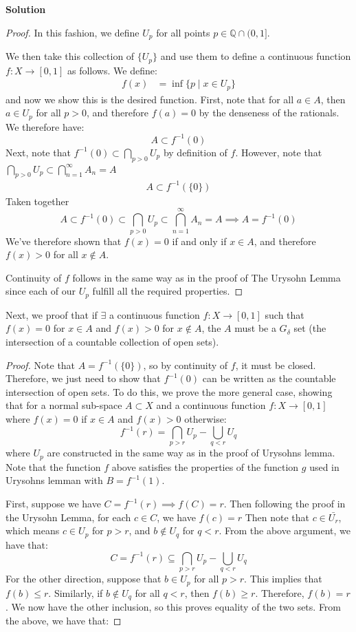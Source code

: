 \documentclass[12pt]{article}
\newcounter{AnswerCounter}
\newcounter{SubAnswerCounter}
\newenvironment{answer}[0]{
  \setcounter{SubAnswerCounter}{1}
  \bigskip
  \textbf{Solution \arabic{AnswerCounter}}
  \\
  \begin{small}
}{
  \end{small}
  \stepcounter{AnswerCounter}
}
\begin{document}
\begin{answer}[Page 213, \#4]
\begin{proof}
In this fashion, we define $U_p$ for all points $p \in \mathbb{Q} \cap (0,1]$.

We then take this collection of $\{ U_p\}$ and use them to define a continuous function $f : X \to [0,1]$ as follows. We define:
\begin{align*}
f(x) &= \inf \{ p \mid x \in U_p \}
\end{align*}
and now we show this is the desired function. First, note that for all $a \in A$, then $a \in U_p$ for all $p > 0$, and therefore $f(a) = 0$ by the denseness of the rationals. We therefore have:
$$
A \subset f^{-1}(0)
$$
Next, note that $f^{-1}(0) \subset \bigcap_{p > 0} U_p$ by definition of $f$. However, note that $\bigcap_{p > 0} U_p \subset \bigcap_{n=1}^{\infty} A_n = A$
\begin{align*}
A \subset f^{-1}(\{0\})
\end{align*}
Taken together
$$
A \subset f^{-1}(0) \subset \bigcap_{p > 0} U_p \subset \bigcap_{n=1}^{\infty} A_n = A \implies A = f^{-1}(0)
$$
We've therefore shown that $f(x) = 0$ if and only if $x \in A$, and therefore $f(x) > 0$ for all $x \notin A$.

Continuity of $f$ follows in the same way as in the proof of The Urysohn Lemma since each of our $U_p$ fulfill all the required properties.
\end{proof}

Next, we proof that if $\exists$ a continuous function $f: X \to [0,1]$ such that $f(x) = 0$ for $x \in A$ and $f(x) > 0$ for $x \notin A$, the $A$ must be a $G_{\delta}$ set (the intersection of a countable collection of open sets).
\begin{proof}
Note that $A = f^{-1}(\{0\})$, so by continuity of $f$, it must be closed. Therefore, we just need to show that $f^{-1}(0)$ can be written as the countable intersection of open sets. To do this, we prove the more general case, showing that for a normal sub-space $A \subset X$ and a continuous function $f: X \to [0,1]$ where $f(x) = 0$ if $x \in A$ and $f(x) > 0$ otherwise:
$$
f^{-1}(r) = \bigcap_{p > r} U_p - \bigcup_{q < r} U_q
$$
where $U_p$ are constructed in the same way as in the proof of Urysohns lemma. Note that the function $f$ above satisfies the properties of the function $g$ used in Urysohns lemman with $B = f^{-1}(1)$.

First, suppose we have $C = f^{-1}(r) \implies f(C) = r$. Then following the proof in the Urysohn Lemma, for each $c \in C$, we have $f(c) = r$ Then note that $c \in \bar{U_r}$, which means $c \in U_p$ for $p > r$, and $b \notin U_q$ for $q < r$. From the above argument, we have that:
$$
C = f^{-1}(r) \subseteq \bigcap_{p > r} U_p - \bigcup_{q < r}U_q
$$
For the other direction, suppose that $b \in U_p$ for all $p > r$. This implies that $f(b) \leq r$. Similarly, if $b \notin U_q$ for all $q < r$, then $f(b) \geq r$. Therefore, $f(b) = r$. We now have the other inclusion, so this proves equality of the two sets.
From the above, we have that:


\end{proof}
\end{answer}
\end{document}
